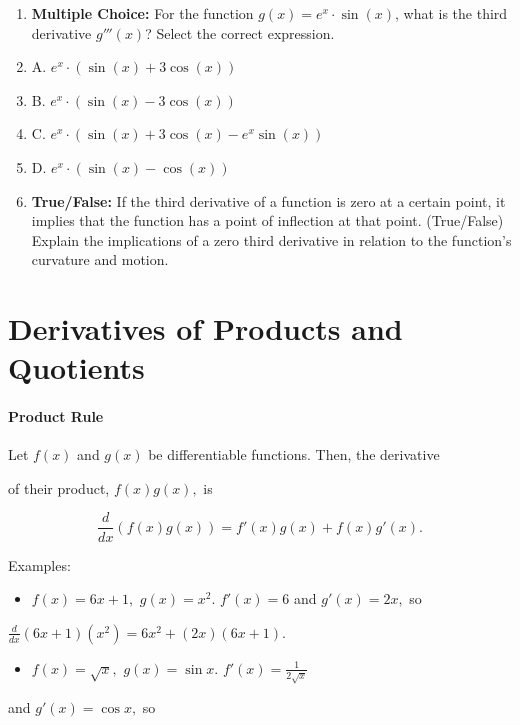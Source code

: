 {{{\begin{enumerate}
    \item \textbf{Multiple Choice:} For the function $g(x) = e^x \cdot \sin(x)$, what is the third derivative $g'''(x)$? Select the correct expression.
    \item A. $e^x \cdot (\sin(x) + 3 \cos(x))$
    \item B. $e^x \cdot (\sin(x) - 3 \cos(x))$
    \item C. $e^x \cdot (\sin(x) + 3 \cos(x) - e^x \sin(x))$
    \item D. $e^x \cdot (\sin(x) - \cos(x))$
    \item \textbf{True/False:} If the third derivative of a function is zero at a certain point, it implies that the function has a point of inflection at that point. (True/False) Explain the implications of a zero third derivative in relation to the function's curvature and motion.
\end{enumerate}

\section{Derivatives of Products and Quotients}
\label{sec:derivatives-of-products-and-quotients}

\paragraph{Product Rule}



Let $f(x)$ and $g(x)$ be differentiable functions. Then, the derivative

of their product, $f(x)g(x),$ is



$$\frac{d}{dx}(f(x)g(x)) = f'(x)g(x) + f(x)g'(x).$$



Examples:



\begin{itemize}
    \item $f(x) = 6x + 1,$ $g(x) = x^2.$ $f'(x) = 6$ and $g'(x) = 2x,$ so
\end{itemize}
    $\frac{d}{dx}(6x + 1)(x^2) = 6x^2 + (2x)(6x + 1).$

\begin{itemize}
    \item $f(x) = \sqrt{x},$ $g(x) = \sin{x}.$ $f'(x) = \frac{1}{2\sqrt{x}}$
\end{itemize}
    and $g'(x) = \cos{x},$ so

}}}
